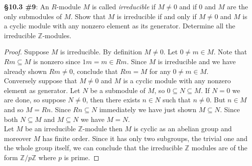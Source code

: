 \documentclass[8pt]{amsart}
\theoremstyle{plain}%
\theoremstyle{definition}
\theoremstyle{remark}
\numberwithin{equation}{section}
\newcommand{\Z}{\mathbb{Z}}
\begin{document}
\textbf{\S 10.3 \#9}: An $R$-module $M$ is called \textit{irreducible} if $M \neq 0$ and if $0$ and $M$ are the only submodules of $M$. Show that $M$ is irreducible if and only if $M \neq 0$ and $M$ is a cyclic module with any nonzero element as its generator. Determine all the irreducible $\Z$-modules.
	\begin{proof}
		Suppose $M$ is irreducible. By definition $M \neq 0$. Let $0 \neq m \in M$. Note that $Rm \subseteq M$ is nonzero since $1m = m \in Rm$. Since $M$ is irreducible and we have already shown $Rm \neq 0$, conclude that $Rm = M$ for any $0 \neq m \in M$.\\

		Conversely suppose that $M \neq 0$ and $M$ is a cyclic module with any nonzero element as generator. Let $N$ be a submodule of $M$, so $0 \subseteq N \subseteq M$. If $N = 0$ we are done, so suppose $N \neq 0$, then there exists $n \in N$ such that $n \neq 0$. But $n \in M$ and so $M = Rn$. Since $Rn \subseteq N$ immediately we have just shown $M \subseteq N$. Since both $N \subseteq M$ and $M \subseteq N$ we have $M = N$.\\

		Let $M$ be an irreducible $\Z$-module then $M$ is cyclic as an abelian group and moreover $M$ has finite order. Since it has only two subgroups, the trivial one and the whole group itself, we can conclude that the irreducible $\Z$ modules are of the form $\Z/p\Z$ where $p$ is prime.
	\end{proof}
\end{document}
